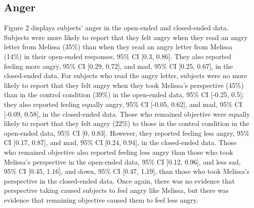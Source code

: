 \documentclass[man,a4paper,noextraspace,apacite]{apa6}\usepackage[]{graphicx}\usepackage[]{color}
\begin{document}
\subsection{Anger}    


Figure 2 displays subjects' anger in the open-ended and closed-ended data. 
    Subjects were more likely to report that they felt angry when they read an angry letter from Melissa (35\%) than when they read an angry letter from Melissa (14\%) in their open-ended responses, 95\% CI [0.3, 0.86]. They also reported feeling more angry, 95\% CI [0.29, 0.72], and mad, 95\% CI [0.25, 0.67], in the closed-ended data.
    For subjects who read the angry letter, subjects were no more likely to report that they felt angry when they took Melissa's perspective (45\%) than in the control condition (39\%) in the open-ended data, 95\% CI [-0.25, 0.5]; they also reported feeling equally angry, 95\% CI [-0.05, 0.62], and mad, 95\% CI [-0.09, 0.58], in the closed-ended data. Those who remained objective were equally likely to report that they felt angry (22\%) to those in the control condition in the open-ended data, 95\% CI [0, 0.83]. However, they reported feeling less angry, 95\% CI [0.17, 0.87], and mad, 95\% CI [0.24, 0.94], in the closed-ended data. Those who remained objective also reported feeling less angry than those who took Melissa's perspective in the open-ended data, 95\% CI [0.12, 0.96], and less sad, 95\% CI [0.45, 1.16], and down, 95\% CI [0.47, 1.19], than those who took Melissa's perspective in the closed-ended data.
    Once again, there was no evidence that perspective taking caused subjects to feel angry like Melissa, but there was evidence that remaining objective caused them to feel less angry.
    
\end{document}
